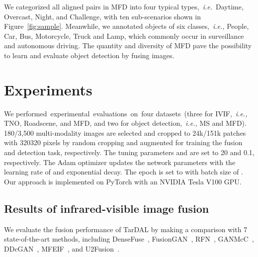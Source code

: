 \documentclass[10pt,twocolumn,letterpaper]{article}
\begin{document}
We categorized all  aligned pairs in MFD into four typical types,~\emph{i.e.}~Daytime, Overcast, Night, and Challenge, with ten sub-scenarios shown in Figure~\ref{fig:sample}. Meanwhile, we annotated  objects of six classes,~\emph{i.e.,} People, Car, Bus, Motorcycle, Truck and Lamp, which commonly occur in surveillance and autonomous driving. The quantity and diversity of MFD pave the possibility to learn and evaluate object detection by fusing images.


\section{Experiments}
We performed~experimental~evaluations~on~four datasets~(three for IVIF,~\emph{i.e.,} TNO, Roadscene, and MFD, and two for object detection,~\emph{i.e.,} MS and MFD). 180/3,500 multi-modality images are selected and cropped to 24k/151k patches with 320320 pixels by random cropping and augmented for training the fusion and detection task, respectively. The tuning parameters  and  are set to 20 and 0.1, respectively. The Adam optimizer updates the network parameters with the learning rate of  and exponential decay. The epoch is set to  with batch size of . Our approach is implemented on PyTorch with an NVIDIA Tesla V100 GPU.
\subsection{Results of infrared-visible image fusion}
We evaluate the fusion performance of TarDAL by making a comparison with 7 state-of-the-art methods, including DenseFuse~\cite{li2018densefuse}, FusionGAN~\cite{ma2019fusiongan}, RFN~\cite{rfn2021}, GANMcC~\cite{GANMcC}, DDcGAN~\cite{ddcgan}, MFEIF~\cite{MFEIF2021}, and U2Fusion~\cite{U2Fusion2020}.
\end{document}
